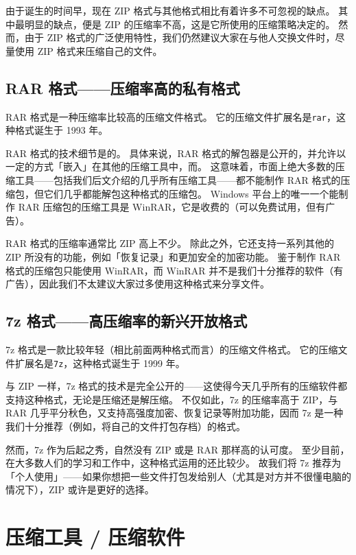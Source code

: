 由于诞生的时间早，现在 ZIP 格式与其他格式相比有着许多不可忽视的缺点。
其中最明显的缺点，便是 ZIP 的压缩率不高，这是它所使用的压缩策略决定的。
然而，由于 ZIP 格式的广泛使用特性，我们仍然建议大家在与他人交换文件时，尽量使用 ZIP 格式来压缩自己的文件。

\subsection{RAR 格式——压缩率高的私有格式}

RAR 格式是一种压缩率比较高的压缩文件格式。
它的压缩文件扩展名是\verb|rar|，这种格式诞生于 1993 年。

RAR 格式的技术细节是的。
具体来说，RAR 格式的解包器是公开的，并允许以一定的方式「嵌入」在其他的压缩工具中，而。
这意味着，市面上绝大多数的压缩工具——包括我们后文介绍的几乎所有压缩工具——都不能制作 RAR 格式的压缩包，但它们几乎都能解包这种格式的压缩包。
Windows 平台上的唯一一个能制作 RAR 压缩包的压缩工具是 WinRAR，它是收费的（可以免费试用，但有广告）。

RAR 格式的压缩率通常比 ZIP 高上不少。
除此之外，它还支持一系列其他的 ZIP 所没有的功能，例如「恢复记录」和更加安全的加密功能。
鉴于制作 RAR 格式的压缩包只能使用 WinRAR，而 WinRAR 并不是我们十分推荐的软件（有广告），因此我们不太建议大家过多使用这种格式来分享文件。

\subsection{7z 格式——高压缩率的新兴开放格式}

7z 格式是一款比较年轻（相比前面两种格式而言）的压缩文件格式。
它的压缩文件扩展名是\verb|7z|，这种格式诞生于 1999 年。

与 ZIP 一样，7z 格式的技术是完全公开的——这使得今天几乎所有的压缩软件都支持这种格式，无论是压缩还是解压缩。
不仅如此，7z 的压缩率高于 ZIP，与 RAR 几乎平分秋色，又支持高强度加密、恢复记录等附加功能，因而 7z 是一种我们十分推荐（例如，将自己的文件打包存档）的格式。

然而，7z 作为后起之秀，自然没有 ZIP 或是 RAR 那样高的认可度。
至少目前，在大多数人们的学习和工作中，这种格式运用的还比较少。
故我们将 7z 推荐为「个人使用」——如果你想把一些文件打包发给别人（尤其是对方并不很懂电脑的情况下），ZIP 或许是更好的选择。

\section{压缩工具 / 压缩软件}


